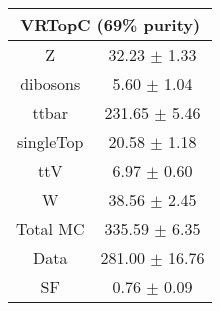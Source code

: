 \begin{tabular}{c|c}
\hline\hline
\multicolumn{2}{c}{\bf VRTopC (69\% purity)} \\ \hline 
Z & 32.23 $\pm$ 1.33 \\
dibosons & 5.60 $\pm$ 1.04 \\
ttbar & 231.65 $\pm$ 5.46 \\
singleTop & 20.58 $\pm$ 1.18 \\
ttV & 6.97 $\pm$ 0.60 \\
W & 38.56 $\pm$ 2.45 \\
\hline
Total MC & 335.59 $\pm$ 6.35 \\
Data & 281.00 $\pm$ 16.76 \\
 \hline
SF & 0.76 $\pm$ 0.09 \\
\hline\hline
\end{tabular}
